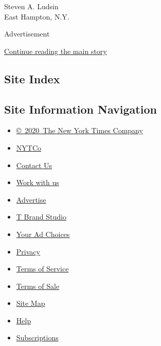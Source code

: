 Steven A. Ludsin\\
East Hampton, N.Y.

Advertisement

\protect\hyperlink{after-bottom}{Continue reading the main story}

\hypertarget{site-index}{%
\subsection{Site Index}\label{site-index}}

\hypertarget{site-information-navigation}{%
\subsection{Site Information
Navigation}\label{site-information-navigation}}

\begin{itemize}
\tightlist
\item
  \href{https://help.nytimes3xbfgragh.onion/hc/en-us/articles/115014792127-Copyright-notice}{©~2020~The
  New York Times Company}
\end{itemize}

\begin{itemize}
\tightlist
\item
  \href{https://www.nytco.com/}{NYTCo}
\item
  \href{https://help.nytimes3xbfgragh.onion/hc/en-us/articles/115015385887-Contact-Us}{Contact
  Us}
\item
  \href{https://www.nytco.com/careers/}{Work with us}
\item
  \href{https://nytmediakit.com/}{Advertise}
\item
  \href{http://www.tbrandstudio.com/}{T Brand Studio}
\item
  \href{https://www.nytimes3xbfgragh.onion/privacy/cookie-policy\#how-do-i-manage-trackers}{Your
  Ad Choices}
\item
  \href{https://www.nytimes3xbfgragh.onion/privacy}{Privacy}
\item
  \href{https://help.nytimes3xbfgragh.onion/hc/en-us/articles/115014893428-Terms-of-service}{Terms
  of Service}
\item
  \href{https://help.nytimes3xbfgragh.onion/hc/en-us/articles/115014893968-Terms-of-sale}{Terms
  of Sale}
\item
  \href{https://spiderbites.nytimes3xbfgragh.onion}{Site Map}
\item
  \href{https://help.nytimes3xbfgragh.onion/hc/en-us}{Help}
\item
  \href{https://www.nytimes3xbfgragh.onion/subscription?campaignId=37WXW}{Subscriptions}
\end{itemize}
